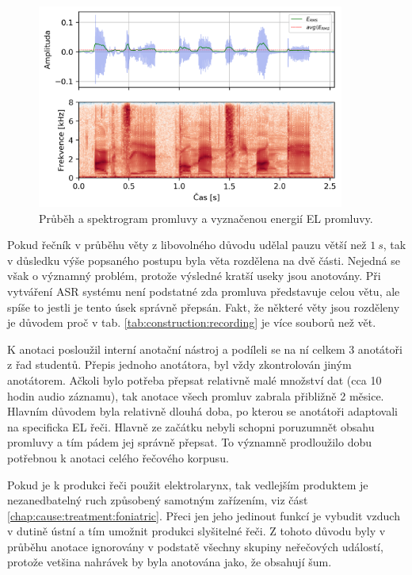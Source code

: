 \begin{figure}[hbpt]
  \centering
  \includegraphics[width=0.9\textwidth]{./ch5-construction/img/energy_spec_el.png}
  \caption{Průběh a spektrogram promluvy a vyznačenou energií EL promluvy.}
  \label{fig:construction:el_speech}
\end{figure}

Pokud řečník v průběhu věty z libovolného důvodu udělal pauzu větší než $1\ s$, tak v důsledku výše popsaného postupu byla věta rozdělena na dvě části. Nejedná se však o významný problém, protože výsledné kratší useky jsou anotovány. Při vytváření ASR systému není podstatné zda promluva představuje celou větu, ale spíše to jestli je tento úsek správně přepsán. Fakt, že některé věty jsou rozděleny je důvodem proč v tab. \ref{tab:construction:recording} je více souborů než vět.

K anotaci posloužil interní anotační nástroj a podíleli se na ní celkem 3 anotátoři z řad studentů. Přepis jednoho anotátora, byl vždy zkontrolován jiným anotátorem. Ačkoli bylo potřeba přepsat relativně malé množství dat (cca 10 hodin audio záznamu), tak anotace všech promluv zabrala přibližně 2 měsice. Hlavním důvodem byla relativně dlouhá doba, po kterou se anotátoři adaptovali na specificka EL řeči. Hlavně ze začátku nebyli schopni poruzumnět obsahu promluvy a tím pádem jej správně přepsat. To významně prodloužilo dobu potřebnou k anotaci celého řečového korpusu.

Pokud je k produkci řeči použit elektrolarynx, tak vedlejším produktem je nezanedbatelný ruch způsobený samotným zařízením, viz část \ref{chap:cause:treatment:foniatric}. Přeci jen jeho jedinout funkcí je vybudit vzduch v dutině ústní a tím umožnit produkci slyšitelné řeči. Z tohoto důvodu byly v průběhu anotace ignorovány v podstatě všechny skupiny neřečových událostí, protože vetšina nahrávek by byla anotována jako, že obsahují šum.

